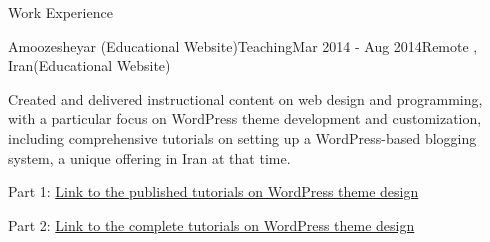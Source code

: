\documentclass[]{kyvernitis-resume}
\begin{document}
\begin{section}{Work Experience}
 \begin{subsection}{Amoozesheyar (Educational Website)}{Teaching}{Mar 2014 - Aug 2014}{Remote , Iran}{(Educational Website)}
	\item Created and delivered instructional content on web design and programming, with a particular focus on WordPress theme development and customization, including comprehensive tutorials on setting up a WordPress-based blogging system, a unique offering in Iran at that time.
	\item Part 1:  \href{https://www.daneshjooyar.com/%d9%82%d8%b3%d9%85%d8%aa-%d9%86%d9%87%d8%a7%db%8c%db%8c-%d8%b3%d8%b1%db%8c-%d8%a2%d9%85%d9%88%d8%b2%d8%b4%db%8c-%d8%b7%d8%b1%d8%a7%d8%ad%db%8c-%d9%82%d8%a7%d9%84%d8%a8-%d9%88%d8%b1%d8%af%d9%be%d8%b1/}{Link to the published tutorials on WordPress theme design} 
	\item Part 2: \href{https://www.daneshjooyar.com/%d8%a2%d9%85%d9%88%d8%b2%d8%b4-%d8%b7%d8%b1%d8%a7%d8%ad%db%8c-%d9%82%d8%a7%d9%84%d8%a8-%d9%88%d8%b1%d8%af%d9%be%d8%b1%d8%b3-%d8%aa%d9%85%d8%a7%d9%85%db%8c-%d9%82%d8%b3%d9%85%d8%aa-%d9%87%d8%a7-%d9%82/}{Link to the complete tutorials on WordPress theme design}
    \end{subsection}
    
\end{section}
\end{document}
